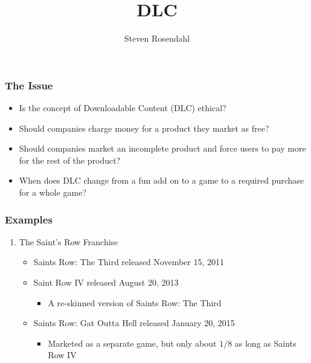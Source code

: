 \documentclass{beamer}
\title{DLC}
\author{Steven Rosendahl}
\date{}
\begin{document}
\frame{\titlepage}

\begin{frame}
\frametitle{The Issue}
\begin{itemize}
\pause
\item Is the concept of Downloadable Content (DLC) ethical?
\pause
\item Should companies charge money for a product they market as free?
\pause
\item Should companies market an incomplete product and force users to pay more for the rest of the product?
\pause
\item When does DLC change from a fun add on to a game to a required purchase for a whole game?
\end{itemize}
\end{frame}

\begin{frame}
\frametitle{Examples}
\begin{enumerate}
\item The Saint's Row Franchise
\pause
\begin{itemize}
\item Saints Row: The Third released November 15, 2011
\pause
\item Saint Row IV released August 20, 2013
\begin{itemize}
\pause
\item A re-skinned version of Saints Row: The Third
\end{itemize}
\pause
\item Saints Row: Gat Outta Hell released January 20, 2015
\begin{itemize}
\pause
\item Marketed as a separate game, but only about $1/8$ as long as Saints Row IV
\end{itemize}
\end{itemize}
\pause
\begin{columns}[T]


\end{columns}
\end{enumerate}
\end{frame}
\end{document}

